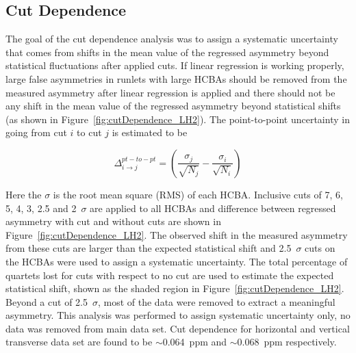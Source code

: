 \subsection{Cut Dependence}
\label{Cut Dependence}
The goal of the cut dependence analysis was to assign a systematic uncertainty that comes from shifts in the mean value of the regressed asymmetry beyond statistical fluctuations after applied cuts. If linear regression is working properly, large false asymmetries in runlets with large HCBAs should be removed from the measured asymmetry after linear regression is applied and there should not be any shift in the mean value of the regressed asymmetry beyond statistical shifts (as shown in Figure~\ref{fig:cutDependence_LH2}).
The point-to-point uncertainty in going from cut $i$ to cut $j$ is estimated to be

\begin{equation} \label{equ:eqCutDependence1}
\Delta_{i \rightarrow j}^{pt-to-pt} = \left( \frac{\sigma_{j}}{\sqrt{N_{j}}} - \frac{\sigma_{i}}{\sqrt{N_{i}}} \right)
\end{equation}


Here the $\sigma$ is the root mean square (RMS) of each HCBA.
Inclusive cuts of 7, 6, 5, 4, 3, 2.5 and 2~$\sigma$ are applied to all HCBAs and difference between regressed asymmetry with cut and without cuts are shown in Figure~\ref{fig:cutDependence_LH2}.
The observed shift in the measured asymmetry from these cuts are larger than the expected statistical shift and 2.5~$\sigma$ cuts on the HCBAs were used to assign a systematic uncertainty. The total percentage of quartets lost for cuts with respect to no cut are used to estimate the expected statistical shift, shown as the shaded region in Figure~\ref{fig:cutDependence_LH2}. Beyond a cut of 2.5~$\sigma$, most of the data were removed to extract a meaningful asymmetry. This analysis was performed to assign systematic uncertainty only, no data was removed from main data set. 
Cut dependence for horizontal and vertical transverse data set are found to be $\sim$0.064~ppm and $\sim$0.068~ppm respectively.


